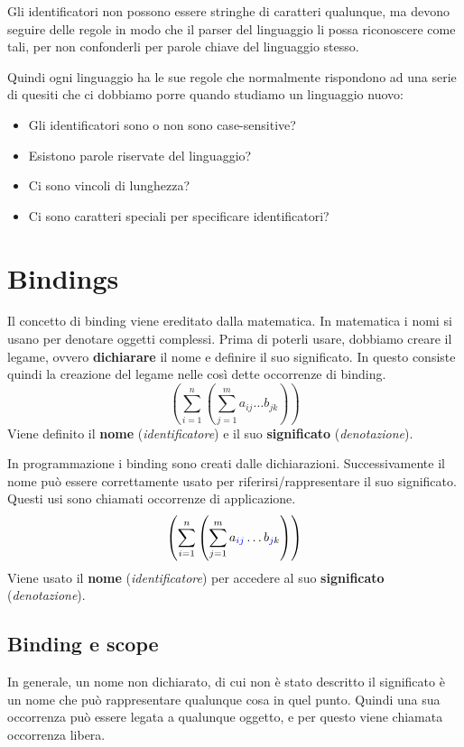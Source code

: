 \documentclass[oneside,a4paper,11pt]{book}
\theoremstyle{italicstyle}
\theoremstyle{normStyle}
\begin{document}
Gli identificatori non possono essere stringhe di caratteri qualunque, ma devono 
seguire delle regole in modo che il parser del linguaggio li possa 
riconoscere come tali, per non confonderli per parole chiave del linguaggio stesso.

Quindi ogni linguaggio ha le sue regole che normalmente rispondono ad una serie 
di quesiti che ci dobbiamo porre quando studiamo un linguaggio nuovo:
\begin{itemize}
  \item Gli identificatori sono o non sono case-sensitive? 
  \item Esistono parole riservate del linguaggio?
  \item Ci sono vincoli di lunghezza?
  \item Ci sono caratteri speciali per specificare identificatori?
\end{itemize} 
\section{Bindings}
Il concetto di binding viene ereditato dalla matematica. In matematica i nomi si 
usano per denotare oggetti complessi. Prima di poterli usare, dobbiamo creare 
il legame, ovvero \textbf{dichiarare} il nome e definire il suo significato.
In questo consiste quindi la creazione del legame nelle così dette occorrenze 
di binding.
\[
  \left(\sum_{i=1}^{n}\left(\sum_{j=1}^{m} a_{ij}\dots b_{jk}\right)\right)
\]
Viene definito il \textbf{nome} (\textit{identificatore}) e il suo 
\textbf{significato} (\textit{denotazione}).

In programmazione i binding sono creati dalle dichiarazioni. Successivamente 
il nome può essere correttamente usato per riferirsi/rappresentare il suo significato.
Questi usi sono chiamati occorrenze di applicazione.
\[
  \left(\sum_{i=1}^{n}\left(\sum_{j=1}^{m} a_{\textcolor{blue}{ij}}\dots b_{\textcolor{blue}{j}k}\right)\right)
\] 
Viene usato il \textbf{nome} (\textit{identificatore}) per accedere al suo 
\textbf{significato} (\textit{denotazione}).
\subsection{Binding e scope}
In generale, un nome non dichiarato, di cui non è stato descritto il significato 
è un nome che può rappresentare qualunque cosa in quel punto.
Quindi una sua occorrenza può essere legata a qualunque oggetto, e per questo viene chiamata
occorrenza libera.
\end{document}
